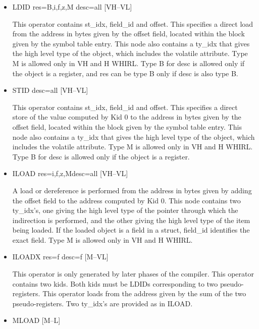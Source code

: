 \begin{itemize}

\item
{}%
LDID res=B,i,f,z,M desc=all \hfill [VH--VL]

This operator contains st\_idx, field\_id and offset. This specifies
a direct load from the address in bytes given by the offset field,
located within the
block given by the symbol table entry. This node also contains a
ty\_idx that gives the high level type of the object, which includes
the volatile attribute. Type M is allowed only in VH and H WHIRL.
Type B for desc is allowed only if the object is a register, and
res can be type B only if desc is also type B. 

\item
{}%
STID desc=all \hfill [VH--VL]

This operator contains st\_idx, field\_id and offset. This specifies
a direct store of the value computed by Kid 0 to the address in
bytes given by the
offset field, located within the block given by the symbol table
entry. This node also contains a ty\_idx that gives the high level
type of the object, which includes the volatile attribute. Type M
is allowed only in VH and H WHIRL. Type B for desc is allowed only
if the object is a register.

\item
{}%
ILOAD res=i,f,z,Mdesc=all \hfill [VH--VL]

A load or dereference is performed from the address in bytes given
by adding the offset field to the address computed by Kid 0. This
node contains two ty\_idx's, one giving the high level type of the
pointer through which the indirection is performed, and the other
giving the high level type of the item being loaded. If the loaded
object is a field in a struct, field\_id identifies the exact field.
Type M is allowed only in VH and H WHIRL. 

\item
{}%
ILOADX res=f desc=f \hfill [M--VL]

This operator is only generated by later phases of the compiler.
This operator contains two kids. Both kids must be
%
LDIDs corresponding to two
pseudo-registers. This operator loads from the address
given by the sum of the two pseudo-registers. Two ty\_idx's are
provided as in
%
ILOAD.

\item
{}%
MLOAD \hfill [M--L]


\end{itemize}
